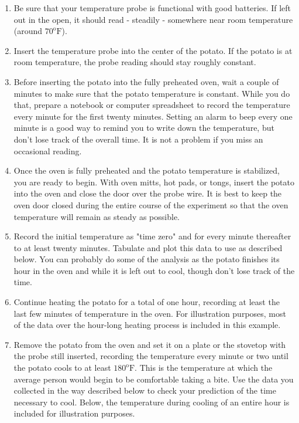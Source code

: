 \documentclass{ximera}
\begin{document}
\begin{enumerate}
\item Be sure that your temperature probe is functional with good batteries.  If left out in the open, it should read - steadily - somewhere near room temperature (around $70^{\text{o}}\text{F}$).
\item Insert the temperature probe into the center of the potato.  If the potato is at room temperature, the probe reading should stay roughly constant. 
\item Before inserting the potato into the fully preheated oven, wait a couple of minutes to make sure that the potato temperature is constant.  While you do that, prepare a notebook or computer spreadsheet to record the temperature every minute for the first twenty minutes.  Setting an alarm to beep every one minute is a good way to remind you to write down the temperature, but don't lose track of the overall time.  It is not a problem if you miss an occasional reading.
\item Once the oven is fully preheated and the potato temperature is stabilized, you are ready to begin.  With oven mitts, hot pads, or tongs, insert the potato into the oven and close the door over the probe wire.  It is best to keep the oven door closed during the entire course of the experiment so that the oven temperature will remain as steady as possible.
\item Record the initial temperature as "time zero" and for every minute thereafter to at least twenty minutes.  Tabulate and plot this data to use as described below.  You can probably do some of the analysis as the potato finishes its hour in the oven and while it is left out to cool, though don't lose track of the time.
\item Continue heating the potato for a total of one hour, recording at least the last few minutes of temperature in the oven.  For illustration purposes, most of the data over the hour-long heating process is included in this example.
\item Remove the potato from the oven and set it on a plate or the stovetop with the probe still inserted, recording the temperature every minute or two until the potato cools to at least $180^{\text{o}}\text{F}$. This is the temperature at which the average person would begin to be comfortable taking a bite.  Use the data you collected in the way described below to check your prediction of the time necessary to cool.  Below, the temperature during cooling of an entire hour is included for illustration purposes.
\end{enumerate}
 
\end{document}
